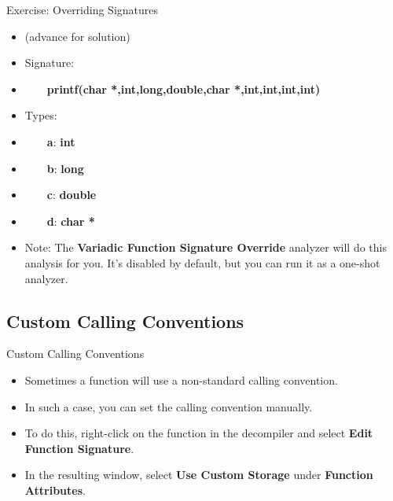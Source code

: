 \documentclass{beamer}
\begin{document}
\begin{frame}
\begin{block}{Exercise: Overriding Signatures}
\begin{itemize}
\item[] (advance for solution)
\pause
\item Signature:
\item[] ~~~~\textbf{printf(char *,int,long,double,char *,int,int,int,int)}
\item Types:
\item[] ~~~~\textbf{a}: \textbf{int}
\item[] ~~~~\textbf{b}: \textbf{long}
\item[] ~~~~\textbf{c}: \textbf{double}
\item[] ~~~~\textbf{d}: \textbf{char *}
\item Note: The \textbf{Variadic Function Signature Override} analyzer will do this analysis for you.  It's disabled by default, but you can 
run it as a one-shot analyzer.
\end{itemize}
\end{block}
\end{frame}

\subsection{Custom Calling Conventions}
\begin{frame}
\begin{block}{Custom Calling Conventions}
\begin{itemize}
\item Sometimes a function will use a non-standard calling convention.
\item In such a case, you can set the calling convention manually.
\item To do this, right-click on the function in the decompiler and select \textbf{Edit Function Signature}.
\item In the resulting window, select \textbf{Use Custom Storage} under \textbf{Function Attributes}.
\end{itemize}
\end{block}
\end{frame}
\end{document}
